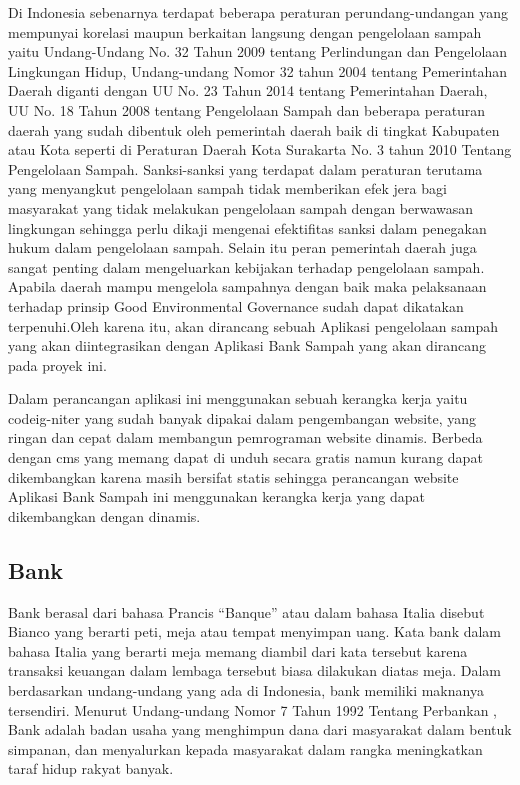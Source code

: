 Di Indonesia sebenarnya terdapat beberapa peraturan perundang-undangan yang mempunyai korelasi maupun berkaitan langsung dengan pengelolaan sampah yaitu Undang-Undang No. 32 Tahun 2009 tentang Perlindungan dan Pengelolaan Lingkungan Hidup, Undang-undang Nomor 32 tahun 2004 tentang Pemerintahan Daerah diganti dengan UU No. 23 Tahun 2014 tentang Pemerintahan Daerah, UU No. 18 Tahun 2008 tentang Pengelolaan Sampah dan beberapa peraturan daerah yang sudah dibentuk oleh pemerintah daerah baik di tingkat Kabupaten atau Kota seperti di Peraturan Daerah Kota Surakarta No. 3 tahun 2010 Tentang Pengelolaan Sampah. Sanksi-sanksi yang terdapat dalam peraturan terutama yang menyangkut pengelolaan sampah tidak memberikan efek jera bagi masyarakat yang tidak melakukan pengelolaan sampah dengan berwawasan lingkungan sehingga perlu dikaji mengenai efektifitas sanksi dalam penegakan hukum dalam pengelolaan sampah. Selain itu peran pemerintah daerah juga sangat penting dalam mengeluarkan kebijakan terhadap pengelolaan sampah. Apabila daerah mampu mengelola sampahnya dengan baik maka pelaksanaan terhadap prinsip Good Environmental Governance sudah dapat dikatakan terpenuhi.Oleh karena itu, akan dirancang sebuah Aplikasi pengelolaan sampah yang akan diintegrasikan dengan Aplikasi Bank Sampah yang akan dirancang pada proyek ini. 

Dalam perancangan aplikasi ini menggunakan sebuah kerangka kerja yaitu codeig-niter yang sudah banyak dipakai dalam pengembangan website, yang ringan dan cepat dalam membangun pemrograman website dinamis. Berbeda dengan cms yang memang dapat di unduh secara gratis namun kurang dapat dikembangkan karena masih bersifat statis sehingga perancangan website Aplikasi Bank Sampah  ini menggunakan kerangka kerja yang dapat dikembangkan dengan dinamis.

\subsection{Bank}
Bank berasal dari bahasa Prancis “Banque” atau dalam bahasa Italia disebut Bianco yang berarti peti, meja atau tempat menyimpan uang. Kata bank dalam bahasa Italia yang berarti meja memang diambil dari kata tersebut karena transaksi keuangan dalam lembaga tersebut biasa dilakukan diatas meja. Dalam  berdasarkan undang-undang yang ada di Indonesia, bank memiliki maknanya tersendiri. Menurut  Undang-undang Nomor 7 Tahun 1992 Tentang Perbankan , Bank adalah badan usaha yang menghimpun dana dari masyarakat dalam bentuk simpanan, dan menyalurkan kepada masyarakat dalam rangka meningkatkan taraf hidup rakyat banyak.


